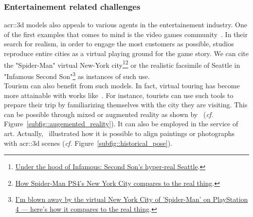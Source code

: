         \subsubsection{Entertainement related challenges}
            \gls{acr::3d} models also appeals to various agents in the entertainement industry.
            One of the first examples that comes to mind is the video games community~\parencite{watson2008procedural}.
            In their search for realism, in order to engage the most customers as possible, studios reproduce entire cities as a virtual playing ground for the game story.
            We can cite the "Spider-Man" virtual New-York city\footnote{
                \href{https://www.polygon.com/2013/9/25/4702318/under-the-hood-of-infamous-second-son-hyper-real-seattle}{Under the hood of Infamous: Second Son's hyper-real Seattle}.
            }\footnote{
                \href{https://www.polygon.com/e3/2018/6/12/17453588/spider-man-ps4-new-york-city-avengers-demo-preview}{How Spider-Man PS4’s New York City compares to the real thing}.
            } or the realistic facsimile of Seattle in "Infamous Second Son"\footnote{
                \href{http://www.businessinsider.fr/us/spider-man-ps4-new-york-city-2018-9}{I'm blown away by the virtual New York City of 'Spider-Man' on PlayStation 4 — here's how it compares to the real thing}.
            } as instances of such use.\\
            Tourism can also benefit from such models.
            In fact, virtual touring has become more attainable with works like~\textcite{koutsoudis20073d}.
            For instance, tourists can use such tools to prepare their trip by familiarizing themselves with the city they are visiting.
            This can be possible through mixed or augmented reality as shown by~\textcite{devaux20183d} (\textit{cf.} Figure~\ref{subfig::augemented_reality}).
            It can also be employed in the service of art.
            Actually,~\textcite{russell2011automatic,aubry2014painting} illustrated how it is possible to align paintings or photographs with \gls{acr::3d} scenes (\textit{cf.} Figure~\ref{subfig::historical_pose}).\\
